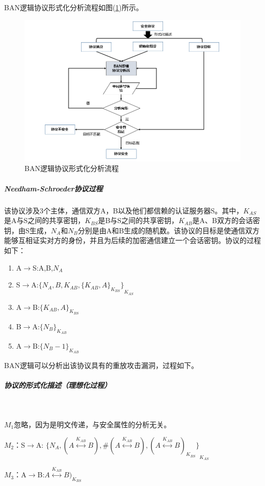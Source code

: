 \documentclass[cs4size,a4pape,UTF8]{ctexart}
\numberwithin{equation}{section}
\numberwithin{table}{section}
\numberwithin{figure}{section}
\begin{document}
BAN逻辑协议形式化分析流程如图(\ref{fig:3})所示。

\begin{figure}[h!]
\centering
\includegraphics[width=0.8\linewidth]{figure/3}
\caption{BAN逻辑协议形式化分析流程}
\label{fig:3}
\end{figure}

\subparagraph{Needham-Schroeder协议过程}
该协议涉及3个主体，通信双方A，B以及他们都信赖的认证服务器S。其中，$K_{AS}$是A与S之间的共享密钥，$K_{BS}$是B与S之间的共享密钥，$K_{AB}$是A、B双方的会话密钥，由S生成，$N_{A}$和$N_{B}$分别是由A和B生成的随机数。该协议的目标是使通信双方能够互相证实对方的身份，并且为后续的加密通信建立一个会话密钥。协议的过程如下：

\begin{enumerate}[(1)]
\item A$\to$S:A,B,$N_{A}$
\item S$\to$A:${\{N_{A},B,K_{AB},{\{K_{AB},A\}}_{K_{BS}}\}}_{K_{AS}}$
\item A$\to$B:${\{K_{AB},A\}}_{K_{BS}}$
\item B$\to$A:${\{N_{B}\}}_{K_{AB}}$
\item A$\to$B:${\{N_{B}-1\}}_{K_{AB}}$
\end{enumerate}

BAN逻辑可以分析出该协议具有的重放攻击漏洞，过程如下。

\subparagraph{协议的形式化描述（理想化过程）}\

$M_{1}$忽略，因为是明文传递，与安全属性的分析无关。

$M_{2}$：S$\to$A: ${\{N_{A},(A\stackrel{K_{AB}}{\longleftrightarrow}B),\#(A\stackrel{K_{AB}}{\longleftrightarrow}B),{(A\stackrel{K_{AB}}{\longleftrightarrow}B)}_{K_{BS}}\}}_{K_{AS}}$

$M_{3}$：A$\to$B:$ {A\stackrel{K_{AB}}{\longleftrightarrow}B)}_{K_{BS}}$ 
\end{document}
